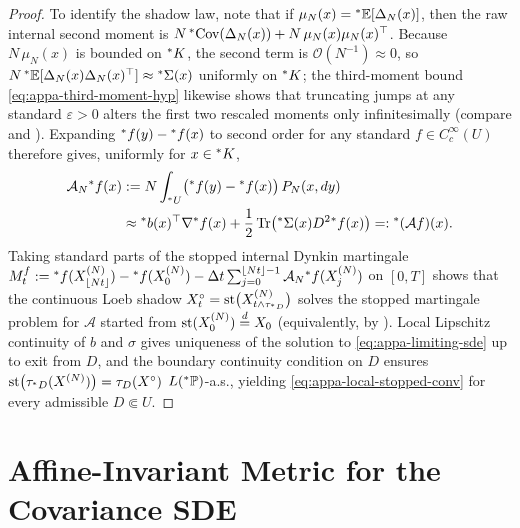 \begin{proof}
To identify the shadow law, note that if $\mu_N(x) = {}^*\mathbb{E}[\Delta_N(x)]$, then the raw internal second moment is $N\,{}^*\!\operatorname{Cov}(\Delta_N(x)) + N\,\mu_N(x)\mu_N(x)^\top$. Because $N\,\mu_N(x)$ is bounded on ${}^*K$, the second term is $\mathcal{O}(N^{-1}) \approx 0$, so $N\,{}^*\mathbb{E}[\Delta_N(x)\Delta_N(x)^\top] \approx {}^*\Sigma(x)$ uniformly on ${}^*K$; the third-moment bound \eqref{eq:appa-third-moment-hyp} likewise shows that truncating jumps at any standard $\varepsilon > 0$ alters the first two rescaled moments only infinitesimally (compare \cite[Lemma 11.2.1]{stroock1997multidimensional} and \cite[Appendix A, Proposition A.6]{li2022neural}). Expanding ${}^*f(y) - {}^*f(x)$ to second order for any standard $f \in C_c^\infty(U)$ therefore gives, uniformly for $x \in {}^*K$,
\begin{equation}
\label{eq:appa-generator-conv}
\begin{aligned}
\mathcal{A}_N {}^*f(x) &:= N \int_{{}^*U} \bigl({}^*f(y) - {}^*f(x)\bigr)\,P_N(x, dy) \\
&\approx {}^*b(x)^\top \nabla{}^*f(x) + \frac{1}{2}\operatorname{Tr}\bigl({}^*\Sigma(x) D^2{}^*f(x)\bigr) =: {}^*(\mathcal{A}f)(x).
\end{aligned}
\end{equation}
Taking standard parts of the stopped internal Dynkin martingale $M_t^f := {}^*f(X_{\lfloor Nt \rfloor}^{(N)}) - {}^*f(X_0^{(N)}) - \Delta t \sum_{j=0}^{\lfloor Nt \rfloor - 1} \mathcal{A}_N{}^*f(X_j^{(N)})$ on $[0, T]$ shows that the continuous Loeb shadow $X^\circ_t = \operatorname{st}\bigl(X_{t \wedge \tau_{{}^*D}}^{(N)}\bigr)$ solves the stopped martingale problem for $\mathcal{A}$ started from $\operatorname{st}(X_0^{(N)}) \stackrel{d}{=} X_0$ \cite{keisler1984infinitesimal,lindstrom1988invitation} (equivalently, by \cite[Theorem 11.2.3]{stroock1997multidimensional}). Local Lipschitz continuity of $b$ and $\sigma$ gives uniqueness of the solution to \eqref{eq:appa-limiting-sde} up to exit from $D$, and the boundary continuity condition on $D$ ensures $\operatorname{st}\bigl(\tau_{{}^*D}(X^{(N)})\bigr) = \tau_D(X^\circ)$ $L({}^*\mathbb{P})$-a.s., yielding \eqref{eq:appa-local-stopped-conv} for every admissible $D \Subset U$.
\end{proof}

\section{Affine-Invariant Metric for the Covariance SDE}
\label{sec:appa-metric}

